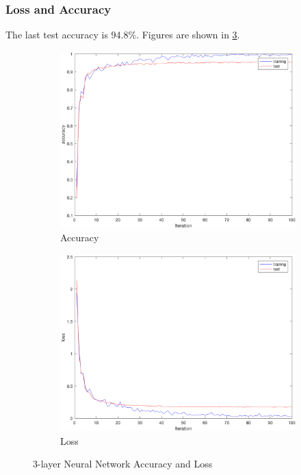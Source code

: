 \subsubsection{Loss and Accuracy}
The last test accuracy is 94.8\%.
Figures are shown in \ref{fig:26}.
\begin{figure}[htbp]
	\centering
	\begin{subfigure}[t]{0.8\textwidth}
	    \centering
        \includegraphics[width=\textwidth]{hw6/accuracy2.png}
		\caption{Accuracy}\label{fig:26a}
	\end{subfigure}
	\begin{subfigure}[t]{0.8\textwidth}
	    \centering
		\includegraphics[width=\textwidth]{hw6/loss2.png}
		\caption{Loss}\label{fig:26b}
	\end{subfigure}
	\caption{3-layer Neural Network Accuracy and Loss}\label{fig:26}
\end{figure}
